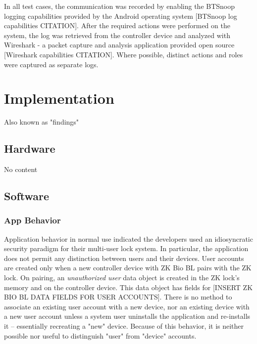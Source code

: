 \documentclass[journal]{IEEEtran}
\begin{document}
\bigskip

In all test cases, the communication was recorded by enabling the BTSnoop logging capabilities provided by the Android operating system [BTSnoop log capabilities CITATION].  After the required actions were performed on the system, the log was retrieved from the controller device and analyzed with Wireshark - a packet capture and analysis application provided open source [Wireshark capabilities CITATION].  Where possible, distinct actions and roles were captured as separate logs.


\section{Implementation}

Also known as "findings"

\subsection{Hardware}
No content

\subsection{Software}

\bigskip        
\subsubsection{App Behavior}

Application behavior in normal use indicated the developers used an idiosyncratic security paradigm for their multi-user lock system.  In particular, the application does not permit any distinction between users and their devices.  User accounts are created only when a new controller device with ZK Bio BL pairs with the ZK lock.  On pairing, an \textit{unauthorized user} data object is created in the ZK lock's memory and on the controller device.  This data object has fields for [INSERT ZK BIO BL DATA FIELDS FOR USER ACCOUNTS].  There is no method to associate an existing user account with a new device, nor an existing device with a new user account unless a system user uninstalls the application and re-installs it -- essentially recreating a "new" device.  Because of this behavior, it is neither possible nor useful to distinguish "user" from "device" accounts.
\end{document}
